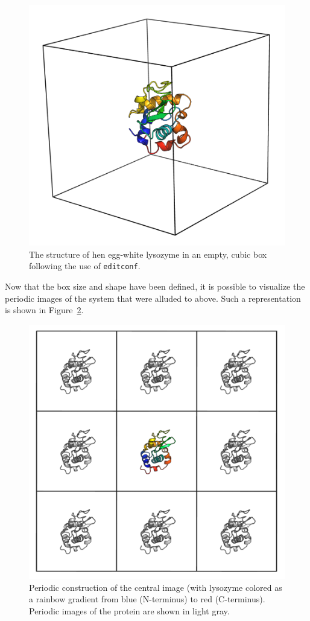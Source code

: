 \documentclass[9pt,tutorial]{livecoms}
\begin{document}
\begin{figure}[h]
\centering
\includegraphics{1AKI_1box}
\caption{The structure of hen egg-white lysozyme in an empty, cubic box following the use of \texttt{editconf}.}
\label{lyso_box_fig}
\end{figure}

Now that the box size and shape have been defined, it is possible to visualize the periodic images of the system that were alluded to above. Such a representation is shown in Figure~\ref{lyso_boxes_fig}.

\begin{figure}[h]
\centering
\includegraphics{1AKI_boxes}
\caption{Periodic construction of the central image (with lysozyme colored as a rainbow gradient from blue (N-terminus) to red (C-terminus). Periodic images of the protein are shown in light gray.}
\label{lyso_boxes_fig}
\end{figure}
\end{document}
